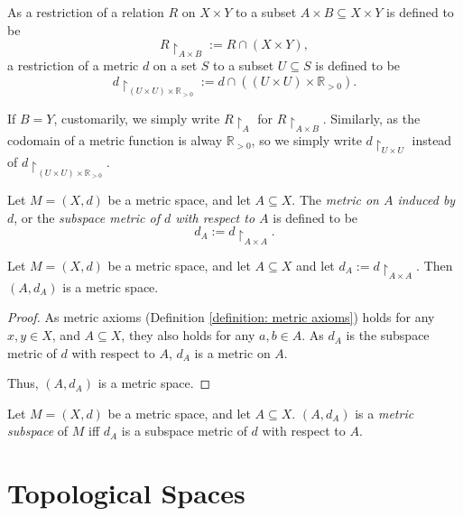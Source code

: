 As a restriction of a relation $R$ on $X \times Y$ to a subset $A \times B \subseteq X \times Y$ is defined to be
$$
R \restriction_{A \times B} := R \cap (X \times Y),
$$
a restriction of a metric $d$ on a set $S$ to a subset $U \subseteq S$ is defined to be
$$
d \restriction_{(U \times U) \times \mathbb R_{> 0}} := d \cap ((U \times U) \times \mathbb R_{> 0}).
$$

If $B = Y$, customarily, we simply write $R \restriction_{A}$ for $R \restriction_{A \times B}$. Similarly, as the codomain of a metric function is alway $\mathbb R_{> 0}$, so we simply write $d \restriction_{U \times U}$ instead of $d \restriction_{(U \times U) \times \mathbb R_{> 0}}$.


\begin{definition}
	\label{definition: subspace metric}
	Let $M = (X, d)$ be a metric space, and let $A \subseteq X$. The \textit{metric on $A$ induced by $d$}, or the \textit{subspace metric of $d$ with respect to $A$} is defined to be
	$$
	d_A := d\restriction_{A \times A}.
	$$
\end{definition}


\begin{theorem}
	Let $M = (X, d)$ be a metric space, and let $A \subseteq X$ and let $d_A := d\restriction_{A \times A}$. Then $(A, d_A)$ is a metric space.
	
	\begin{proof}		
		As metric axioms (Definition \ref{definition: metric axioms}) holds for any $x,y \in X$, and $A \subseteq X$, they also holds for any $a, b \in A$. As $d_A$ is the subspace metric of $d$ with respect to $A$, $d_A$ is a metric on $A$.
		
		Thus, $(A, d_A)$ is a metric space.
	\end{proof}
\end{theorem}


\begin{definition}
	\label{definition: metric subspace}
	Let $M = (X, d)$ be a metric space, and let $A \subseteq X$. $(A, d_A)$ is a \textit{metric subspace} of $M$ iff $d_A$ is a subspace metric of $d$ with respect to $A$.
\end{definition}



\chapter{Topological Spaces}


